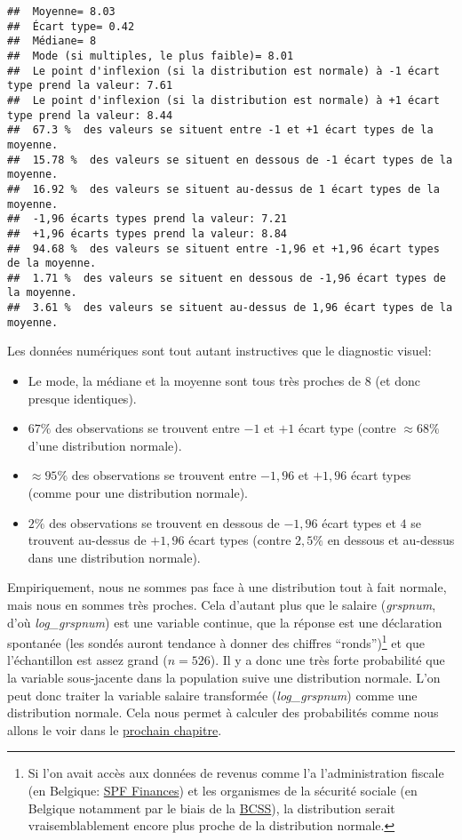 \documentclass[
]{book}
\providecommand{\tightlist}{%
  \setlength{\itemsep}{0pt}\setlength{\parskip}{0pt}}
\begin{document}
\begin{verbatim}
##  Moyenne= 8.03 
##  Écart type= 0.42 
##  Médiane= 8 
##  Mode (si multiples, le plus faible)= 8.01 
##  Le point d'inflexion (si la distribution est normale) à -1 écart type prend la valeur: 7.61 
##  Le point d'inflexion (si la distribution est normale) à +1 écart type prend la valeur: 8.44 
##  67.3 %  des valeurs se situent entre -1 et +1 écart types de la moyenne. 
##  15.78 %  des valeurs se situent en dessous de -1 écart types de la moyenne. 
##  16.92 %  des valeurs se situent au-dessus de 1 écart types de la moyenne. 
##  -1,96 écarts types prend la valeur: 7.21 
##  +1,96 écarts types prend la valeur: 8.84 
##  94.68 %  des valeurs se situent entre -1,96 et +1,96 écart types de la moyenne. 
##  1.71 %  des valeurs se situent en dessous de -1,96 écart types de la moyenne. 
##  3.61 %  des valeurs se situent au-dessus de 1,96 écart types de la moyenne.
\end{verbatim}

Les données numériques sont tout autant instructives que le diagnostic visuel:

\begin{itemize}
\tightlist
\item
  Le mode, la médiane et la moyenne sont tous très proches de \(8\) (et donc presque identiques).
\item
  \(67\%\) des observations se trouvent entre \(-1\) et \(+1\) écart type (contre \(\approx68\%\) d'une distribution normale).
\item
  \(\approx95\%\) des observations se trouvent entre \(-1,96\) et \(+1,96\) écart types (comme pour une distribution normale).
\item
  \(2\%\) des observations se trouvent en dessous de \(-1,96\) écart types et \(4%
  \) se trouvent au-dessus de \(+1,96\) écart types (contre \(2,5\%\) en dessous et au-dessus dans une distribution normale).
\end{itemize}

Empiriquement, nous ne sommes pas face à une distribution tout à fait normale, mais nous en sommes très proches. Cela d'autant plus que le salaire (\emph{grspnum}, d'où \emph{log\_grspnum}) est une variable continue, que la réponse est une déclaration spontanée (les sondés auront tendance à donner des chiffres ``ronds'')\footnote{Si l'on avait accès aux données de revenus comme l'a l'administration fiscale (en Belgique: \href{https://finances.belgium.be/fr}{SPF Finances}) et les organismes de la sécurité sociale (en Belgique notamment par le biais de la \href{https://www.ksz-bcss.fgov.be/fr}{BCSS}), la distribution serait vraisemblablement encore plus proche de la distribution normale.} et que l'échantillon est assez grand (\(n=526\)). Il y a donc une très forte probabilité que la variable sous-jacente dans la population suive une distribution normale. L'on peut donc traiter la variable salaire transformée (\emph{log\_grspnum}) comme une distribution normale. Cela nous permet à calculer des probabilités comme nous allons le voir dans le \protect\hyperlink{distribution_normale_proba}{prochain chapitre}.
\end{document}
